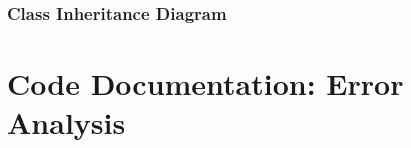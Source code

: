 \documentclass[letterpaper,10pt,english]{sphinxmanual}
\begin{document}
\begin{fulllineitems}
\begin{fulllineitems}
\label{\detokenize{api/mastml.datasets.SklearnDatasets:mastml.datasets.SklearnDatasets.load_iris}}
\end{fulllineitems}


\begin{fulllineitems}
\label{\detokenize{api/mastml.datasets.SklearnDatasets:mastml.datasets.SklearnDatasets.load_linnerud}}
\end{fulllineitems}


\begin{fulllineitems}
\label{\detokenize{api/mastml.datasets.SklearnDatasets:mastml.datasets.SklearnDatasets.load_wine}}
\end{fulllineitems}


\end{fulllineitems}



\subsection{Class Inheritance Diagram}
\label{\detokenize{3_datasets:class-inheritance-diagram}}


\chapter{Code Documentation: Error Analysis}
\label{\detokenize{4_error_analysis:code-documentation-error-analysis}}\label{\detokenize{4_error_analysis::doc}}
\end{document}
